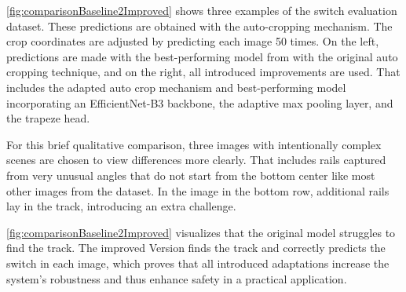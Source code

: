 \autoref{fig:comparisonBaseline2Improved} shows three examples of the switch evaluation dataset.
These predictions are obtained with the auto-cropping mechanism.
The crop coordinates are adjusted by predicting each image 50 times.
On the left, predictions are made with the best-performing model from \cite{tepNet2024} with the original auto cropping technique, and on the right, all introduced improvements are used.
That includes the adapted auto crop mechanism and best-performing model incorporating an EfficientNet-B3 backbone, the adaptive max pooling layer, and the trapeze head.

For this brief qualitative comparison, three images with intentionally complex scenes are chosen to view differences more clearly.
That includes rails captured from very unusual angles that do not start from the bottom center like most other images from the dataset.
In the image in the bottom row, additional rails lay in the track, introducing an extra challenge.

\autoref{fig:comparisonBaseline2Improved} visualizes that the original model \cite{tepNet2024} struggles to find the track.
The improved Version finds the track and correctly predicts the switch in each image, which proves that all introduced adaptations increase the system's robustness and thus enhance safety in a practical application.

